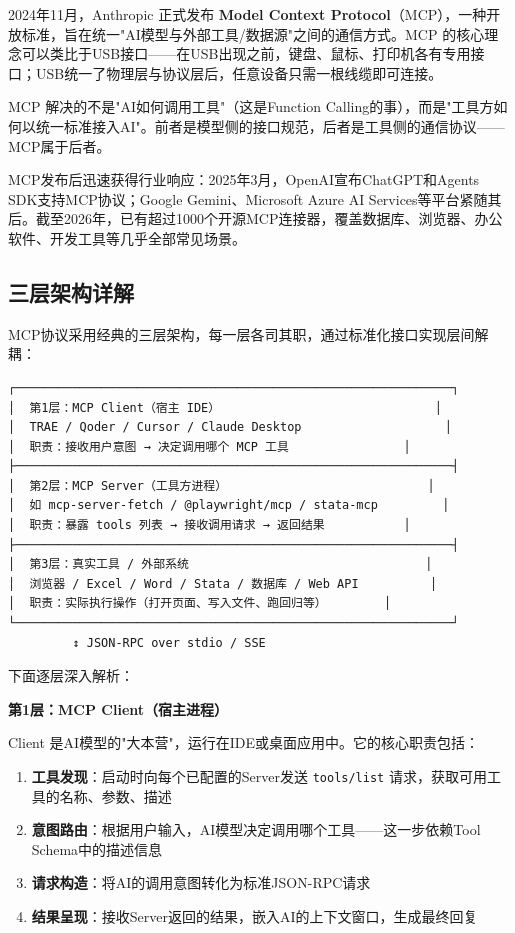 2024年11月，Anthropic 正式发布 \textbf{Model Context Protocol}（MCP），一种开放标准，旨在统一"AI模型与外部工具/数据源"之间的通信方式。MCP 的核心理念可以类比于USB接口——在USB出现之前，键盘、鼠标、打印机各有专用接口；USB统一了物理层与协议层后，任意设备只需一根线缆即可连接。

\begin{notebox}[关键定位]
MCP 解决的不是"AI如何调用工具"（这是Function Calling的事），而是"工具方如何以统一标准接入AI"。前者是模型侧的接口规范，后者是工具侧的通信协议——MCP属于后者。
\end{notebox}

MCP发布后迅速获得行业响应：2025年3月，OpenAI宣布ChatGPT和Agents SDK支持MCP协议；Google Gemini、Microsoft Azure AI Services等平台紧随其后。截至2026年，已有超过1000个开源MCP连接器，覆盖数据库、浏览器、办公软件、开发工具等几乎全部常见场景。

\subsection{三层架构详解}

MCP协议采用经典的三层架构，每一层各司其职，通过标准化接口实现层间解耦：

\begin{verbatim}
┌─────────────────────────────────────────────────────────────┐
│  第1层：MCP Client（宿主 IDE）                              │
│  TRAE / Qoder / Cursor / Claude Desktop                    │
│  职责：接收用户意图 → 决定调用哪个 MCP 工具                │
├─────────────────────────────────────────────────────────────┤
│  第2层：MCP Server（工具方进程）                            │
│  如 mcp-server-fetch / @playwright/mcp / stata-mcp         │
│  职责：暴露 tools 列表 → 接收调用请求 → 返回结果           │
├─────────────────────────────────────────────────────────────┤
│  第3层：真实工具 / 外部系统                                 │
│  浏览器 / Excel / Word / Stata / 数据库 / Web API          │
│  职责：实际执行操作（打开页面、写入文件、跑回归等）        │
└─────────────────────────────────────────────────────────────┘
         ↕ JSON-RPC over stdio / SSE
\end{verbatim}

下面逐层深入解析：

\textbf{第1层：MCP Client（宿主进程）}

Client 是AI模型的"大本营"，运行在IDE或桌面应用中。它的核心职责包括：

\begin{enumerate}[leftmargin=2em]
  \item \textbf{工具发现}：启动时向每个已配置的Server发送 \texttt{tools/list} 请求，获取可用工具的名称、参数、描述
  \item \textbf{意图路由}：根据用户输入，AI模型决定调用哪个工具——这一步依赖Tool Schema中的描述信息
  \item \textbf{请求构造}：将AI的调用意图转化为标准JSON-RPC请求
  \item \textbf{结果呈现}：接收Server返回的结果，嵌入AI的上下文窗口，生成最终回复
\end{enumerate}

